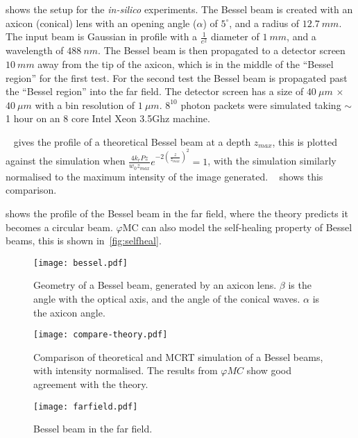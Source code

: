  shows the setup for the \textit{in-silico} experiments.
The Bessel beam is created with an axicon (conical) lens with an opening angle ($\alpha$) of $5^{\circ}$, and a radius of $12.7~mm$.
The input beam is Gaussian in profile with a $\tfrac{1}{e^2}$ diameter of $1~mm$, and a wavelength of $488~nm$.
The Bessel beam is then propagated to a detector screen $10~mm$ away from the tip of the axicon, which is in the middle of the ``Bessel region'' for the first test.
For the second test the Bessel beam is propagated past the ``Bessel region'' into the far field.
The detector screen has a size of $40~\mu m$ $\times$ $40~\mu m$ with a bin resolution of $1~\mu m$.
$8^{10}$ photon packets were simulated taking $\sim$ 1 hour on an 8 core Intel Xeon 3.5Ghz machine.

\medskip

~ gives the profile of a theoretical Bessel beam at a depth $z_{max}$, this is plotted against the simulation when $\tfrac{4k_rPz}{w_0z_{max}}e^{-2\left(\tfrac{z}{z_{max}}\right)^2}=1$, with the simulation similarly normalised to the maximum intensity of the image generated. ~ shows this comparison.

 shows the profile of the Bessel beam in the far field, where the theory predicts it becomes a circular beam.
$\varphi$MC can also model the self-healing property of Bessel beams, this is shown in~\cref{fig:selfheal}.

\begin{figure}[!htbp]
    \centering
    \texttt{[image: bessel.pdf]}
    \caption{Geometry of a Bessel beam, generated by an axicon lens. $\beta$ is the angle with the optical axis, and the angle of the conical waves. $\alpha$ is the axicon angle.}
    \label{fig:besselgeo}
\end{figure}


\begin{figure}[!htbp]
    \centering
    \texttt{[image: compare-theory.pdf]}
    \caption{Comparison of theoretical and MCRT simulation of a Bessel beams, with intensity normalised. The results from $\varphi MC$ show good agreement with the theory.}
    \label{fig:besselCompare}
\end{figure}

\begin{figure}[!htbp]
\centering
\texttt{[image: farfield.pdf]}
\caption{Bessel beam in the far field.}
\label{fig:farfield}
\end{figure}

